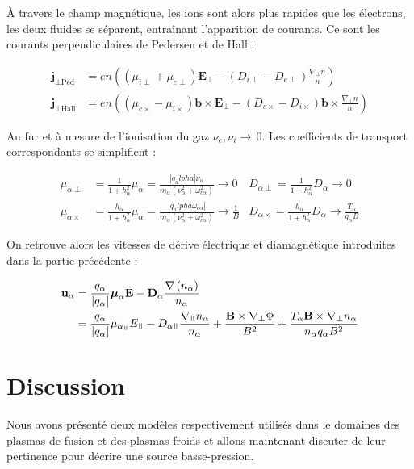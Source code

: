 \begin{refsection}
À travers le champ magnétique, les ions sont alors plus rapides que les
électrons, les deux fluides se séparent, entraînant l'apparition de
courants. Ce sont les courants perpendiculaires de Pedersen et de Hall :

\begin{align}
\mathbf j_{\perp\text{Ped}}&=en\left((\mu_{i\perp}+\mu_{e\perp})\mathbf E_\perp
- (D_{i\perp}-D_{e\perp})\frac{\nabla_\perp n}{n}\right)\\
\mathbf j_{\perp\text{Hall}}&=en\left((\mu_{e\times}-\mu_{i\times})\mathbf
b\times\mathbf E_\perp - (D_{e\times}-D_{i\times})\mathbf
b\times\frac{\nabla_\perp n}{n}\right)
\end{align}

Au fur et à mesure de l'ionisation du gaz $\nu_e, \nu_i\rightarrow\,$0. Les
coefficients de transport correspondants se simplifient :

\begin{align}
\mu_{\alpha\perp}&=\frac{1}{1+h_\alpha^2}\mu_\alpha=\frac{|q_alpha|\nu_\alpha}{m_\alpha(\nu_\alpha^2+\omega_{c\alpha}^2)}\rightarrow
0 &D_{\alpha\perp}=\frac{1}{1+h_\alpha^2}D_\alpha\rightarrow 0
\\
\mu_{\alpha\times}&=\frac{h_\alpha}{1+h_\alpha^2}\mu_\alpha=\frac{|q_alpha\omega_{c\alpha}|}{m_\alpha(\nu_\alpha^2+\omega_{c\alpha}^2)}\rightarrow\frac{1}{B}
&D_{\alpha\times}=\frac{h_\alpha}{1+h_\alpha^2}D_\alpha\rightarrow\frac{T_\alpha}{q_\alpha
B}
\end{align}

On retrouve alors les vitesses de dérive électrique et diamagnétique
introduites dans la partie précédente :

\begin{equation}
\begin{split}
\mathbf u_\alpha&=\frac{q_\alpha}{|q_\alpha|}\boldsymbol{\mu}_\alpha
\mathbf E-\mathbf D_\alpha\frac{\nabla\left( n_\alpha\right)}{n_\alpha}
\\
&= \frac{q_\alpha}{|q_\alpha|}\mu_{\alpha_\para} E_\para -
D_{\alpha\para}\frac{\nabla_\para n_\alpha}{n_\alpha} + \frac{\mathbf
B\times\nabla_\perp \Phi}{B^2}+\frac{T_\alpha\mathbf B\times\nabla_\perp
n_\alpha}{n_\alpha q_\alpha B^2}
\end{split}
\end{equation}

\section{Discussion}
Nous avons présenté deux modèles respectivement utilisés dans le domaines des
plasmas de fusion et des plasmas froids et allons maintenant discuter de leur
pertinence pour décrire une source basse-pression.


\end{refsection}
